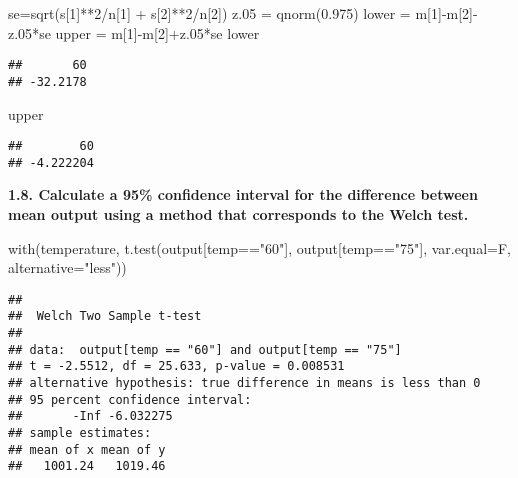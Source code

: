 \documentclass[
]{article}
\newenvironment{Shaded}{\begin{snugshade}}{\end{snugshade}}
\newcommand{\AttributeTok}[1]{\textcolor[rgb]{0.77,0.63,0.00}{#1}}
\newcommand{\DecValTok}[1]{\textcolor[rgb]{0.00,0.00,0.81}{#1}}
\newcommand{\FloatTok}[1]{\textcolor[rgb]{0.00,0.00,0.81}{#1}}
\newcommand{\FunctionTok}[1]{\textcolor[rgb]{0.00,0.00,0.00}{#1}}
\newcommand{\NormalTok}[1]{#1}
\newcommand{\OtherTok}[1]{\textcolor[rgb]{0.56,0.35,0.01}{#1}}
\newcommand{\SpecialCharTok}[1]{\textcolor[rgb]{0.00,0.00,0.00}{#1}}
\newcommand{\StringTok}[1]{\textcolor[rgb]{0.31,0.60,0.02}{#1}}
\begin{document}
\begin{Shaded}
\begin{Highlighting}[]
\NormalTok{se}\OtherTok{=}\FunctionTok{sqrt}\NormalTok{(s[}\DecValTok{1}\NormalTok{]}\SpecialCharTok{**}\DecValTok{2}\SpecialCharTok{/}\NormalTok{n[}\DecValTok{1}\NormalTok{] }\SpecialCharTok{+}\NormalTok{ s[}\DecValTok{2}\NormalTok{]}\SpecialCharTok{**}\DecValTok{2}\SpecialCharTok{/}\NormalTok{n[}\DecValTok{2}\NormalTok{])}
\NormalTok{z}\FloatTok{.05} \OtherTok{=} \FunctionTok{qnorm}\NormalTok{(}\FloatTok{0.975}\NormalTok{)}
\NormalTok{lower }\OtherTok{=}\NormalTok{ m[}\DecValTok{1}\NormalTok{]}\SpecialCharTok{{-}}\NormalTok{m[}\DecValTok{2}\NormalTok{]}\SpecialCharTok{{-}}\NormalTok{z}\FloatTok{.05}\SpecialCharTok{*}\NormalTok{se}
\NormalTok{upper }\OtherTok{=}\NormalTok{ m[}\DecValTok{1}\NormalTok{]}\SpecialCharTok{{-}}\NormalTok{m[}\DecValTok{2}\NormalTok{]}\SpecialCharTok{+}\NormalTok{z}\FloatTok{.05}\SpecialCharTok{*}\NormalTok{se}
\NormalTok{lower}
\end{Highlighting}
\end{Shaded}

\begin{verbatim}
##       60 
## -32.2178
\end{verbatim}

\begin{Shaded}
\begin{Highlighting}[]
\NormalTok{upper}
\end{Highlighting}
\end{Shaded}

\begin{verbatim}
##        60 
## -4.222204
\end{verbatim}

\textbf{1.8. Calculate a 95\% confidence interval for the difference
between mean output using a method that corresponds to the Welch test.}

\begin{Shaded}
\begin{Highlighting}[]
\FunctionTok{with}\NormalTok{(temperature, }\FunctionTok{t.test}\NormalTok{(output[temp}\SpecialCharTok{==}\StringTok{"60"}\NormalTok{], output[temp}\SpecialCharTok{==}\StringTok{"75"}\NormalTok{], }\AttributeTok{var.equal=}\NormalTok{F, }\AttributeTok{alternative=}\StringTok{"less"}\NormalTok{))}
\end{Highlighting}
\end{Shaded}

\begin{verbatim}
## 
##  Welch Two Sample t-test
## 
## data:  output[temp == "60"] and output[temp == "75"]
## t = -2.5512, df = 25.633, p-value = 0.008531
## alternative hypothesis: true difference in means is less than 0
## 95 percent confidence interval:
##       -Inf -6.032275
## sample estimates:
## mean of x mean of y 
##   1001.24   1019.46
\end{verbatim}
\end{document}
